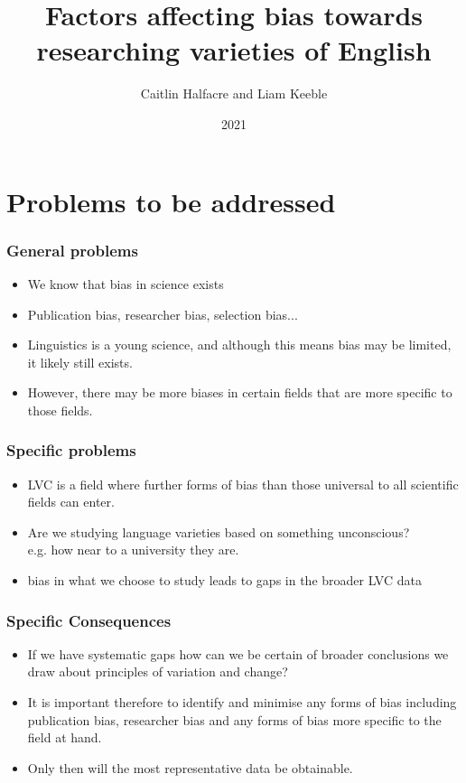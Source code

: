 \documentclass{beamer}
\title{Factors affecting bias towards researching varieties of English}
\author{Caitlin Halfacre and Liam Keeble}
\date{2021}
\begin{document}
\frame{\titlepage}


\section{Problems to be addressed}
\begin{frame}
\frametitle{General problems}
\begin{itemize}
\item We know that bias in science exists
\item Publication bias, researcher bias, selection bias...
\item Linguistics is a young science, and although this means bias may be limited, it likely still exists.
\item However, there may be more biases in certain fields that are more specific to those fields.
\end{itemize}
\end{frame}


\begin{frame}
\frametitle{Specific problems}
\begin{itemize}
\item LVC is a field where further forms of bias than those universal to all scientific fields can enter.
\item Are we studying language varieties based on something unconscious? \\ e.g. how near to a university they are.
\item bias in what we choose to study leads to gaps in the broader LVC data
\end{itemize}
\end{frame}

\begin{frame}
\frametitle{Specific Consequences}
\begin{itemize}
\item If we have systematic gaps how can we be certain of broader conclusions we draw about principles of variation and change?
\item It is important therefore to identify and minimise any forms of bias including publication bias, researcher bias and any forms of bias more specific to the field at hand.
\item Only then will the most representative data be obtainable.
\end{itemize}
\end{frame}
\end{document}
